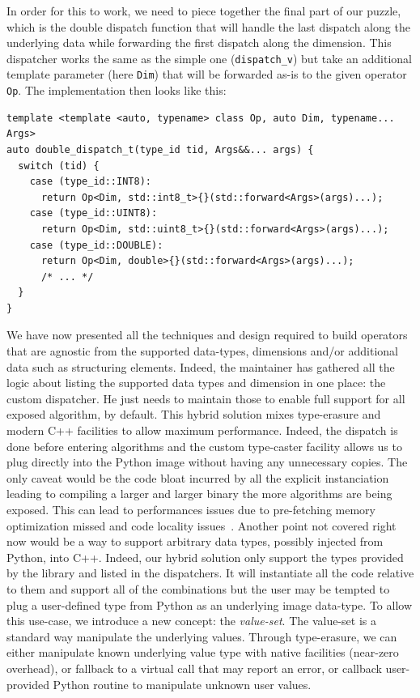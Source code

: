 In order for this to work, we need to piece together the final part of our puzzle, which is the double dispatch function
that will handle the last dispatch along the underlying data while forwarding the first dispatch along the dimension.
This dispatcher works the same as the simple one (\texttt{dispatch\_v}) but take an additional template parameter (here
\texttt{Dim}) that will be forwarded as-is to the given operator \texttt{Op}. The implementation then looks like this:
\begin{verbatim}
template <template <auto, typename> class Op, auto Dim, typename... Args>
auto double_dispatch_t(type_id tid, Args&&... args) {
  switch (tid) {
    case (type_id::INT8):
      return Op<Dim, std::int8_t>{}(std::forward<Args>(args)...);
    case (type_id::UINT8):
      return Op<Dim, std::uint8_t>{}(std::forward<Args>(args)...);
    case (type_id::DOUBLE):
      return Op<Dim, double>{}(std::forward<Args>(args)...);
      /* ... */
  }
}
\end{verbatim}
We have now presented all the techniques and design required to build operators that are agnostic from the supported
data-types, dimensions and/or additional data such as structuring elements. Indeed, the maintainer has gathered all the
logic about listing the supported data types and dimension in one place: the custom dispatcher. He just needs to
maintain those to enable full support for all exposed algorithm, by default. This hybrid solution mixes type-erasure and
modern C++ facilities to allow maximum performance. Indeed, the dispatch is done before entering algorithms and the
custom type-caster facility allows us to plug directly into the Python image without having any unnecessary copies. The
only caveat would be the code bloat incurred by all the explicit instanciation leading to compiling a larger and larger
binary the more algorithms are being exposed. This can lead to performances issues due to pre-fetching memory
optimization missed and code locality issues~\parencite{badawy.2001.locality}. Another point not covered right now would
be a way to support arbitrary data types, possibly injected from Python, into C++. Indeed, our hybrid solution only
support the types provided by the library and listed in the dispatchers. It will instantiate all the code relative to
them and support all of the combinations but the user may be tempted to plug a user-defined type from Python as an
underlying image data-type. To allow this use-case, we introduce a new concept: the \emph{value-set}. The value-set is a
standard way manipulate the underlying values. Through type-erasure, we can either manipulate known underlying value
type with native facilities (near-zero overhead), or fallback to a virtual call that may report an error, or callback
user-provided Python routine to manipulate unknown user values.


